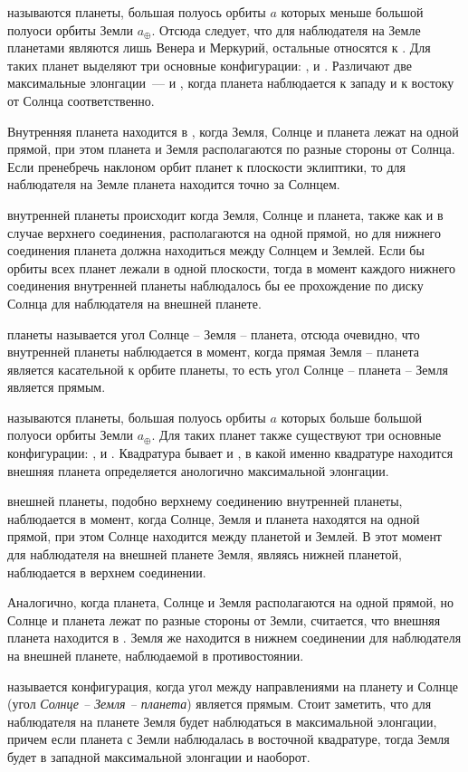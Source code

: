  называются планеты, большая полуось орбиты 
$a$ которых меньше большой полуоси орбиты Земли $a_\oplus$. Отсюда следует, что для наблюдателя на Земле  планетами являются лишь Венера и Меркурий, остальные относятся к . Для таких планет выделяют три основные конфигурации: ,  и . Различают две максимальные элонгации~---  и , когда планета наблюдается к западу и к востоку от Солнца соответственно.

Внутренняя планета находится в , когда Земля, Солнце и планета лежат на одной прямой, при этом планета и Земля располагаются по разные стороны от Солнца. Если пренебречь наклоном орбит планет к плоскости эклиптики, то для наблюдателя на Земле планета находится точно за Солнцем.

 внутренней планеты происходит когда Земля, Солнце и планета, также как и в случае верхнего соединения, располагаются на одной прямой, но для нижнего соединения планета должна находиться между Солнцем и Землей. Если бы орбиты всех планет лежали в одной плоскости, тогда в момент каждого нижнего соединения внутренней планеты наблюдалось бы ее прохождение по диску Солнца для наблюдателя на внешней планете.

 планеты называется угол Солнце -- Земля -- планета, отсюда очевидно, что  внутренней планеты наблюдается в момент, когда прямая Земля -- планета является касательной к орбите планеты, то есть угол Солнце -- планета -- Земля является прямым.

 называются планеты, большая полуось орбиты $a$ которых больше большой полуоси орбиты Земли $a_\oplus$. Для таких планет также существуют три основные конфигурации: ,  и 
. Квадратура бывает  и , в какой именно квадратуре находится внешняя планета определяется анологично максимальной элонгации.

 внешней планеты, подобно верхнему соединению внутренней планеты, наблюдается в момент, когда Солнце, Земля и планета находятся на одной прямой, при этом Солнце находится между планетой и Землей. В этот момент для наблюдателя на внешней планете Земля, являясь нижней планетой, наблюдается в верхнем соединении.

Аналогично, когда планета, Солнце и Земля располагаются на одной прямой, но Солнце и планета лежат по разные стороны от Земли, считается, что внешняя планета находится в . Земля же находится в нижнем соединении для наблюдателя на внешней планете, наблюдаемой в противостоянии.

 называется конфигурация, когда угол между направлениями на планету и Солнце (угол {\slshape Солнце -- Земля -- планета}) является прямым. Стоит заметить, что для наблюдателя на планете Земля будет наблюдаться в максимальной элонгации, причем если планета с Земли наблюдалась в восточной квадратуре, тогда Земля будет в западной максимальной элонгации и наоборот.
